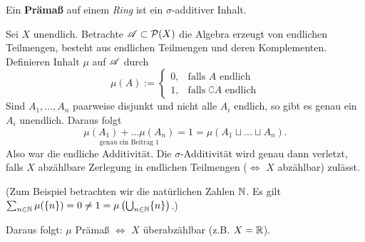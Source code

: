 \begin{definition}
\begin{mdframed}
Ein \textbf{Prämaß} auf einem \emph{Ring} ist ein $\sigma$-additiver Inhalt.
\end{mdframed}
\end{definition}

\begin{example}
Sei $X$ unendlich. Betrachte $\AA \subset \mathcal{P}(X)$ die Algebra erzeugt von endlichen Teilmengen, besteht aus endlichen Teilmengen und deren Komplementen. Definieren Inhalt $\mu$ auf $\AA$ durch
$$ \mu (A) := \begin{cases}
	0, & \text{falls } A \text{ endlich} \\
	1, & \text{falls } \complement A \text{ endlich}
	\end{cases}$$
Sind $A_1,...,A_n$ paarweise disjunkt und nicht alle $A_i$ endlich, so gibt es genau ein $A_i$ unendlich. Daraus folgt
$$\underset{\text{genau ein Beitrag }1}{\mu(A_1)+...\mu(A_n)} = 1 = \mu(A_1 \sqcup ... \sqcup A_n).$$
Also war die endliche Additivität. Die $\sigma$-Additivität wird genau dann verletzt, falls $X$ abzählbare Zerlegung in endlichen Teilmengen ($\iff$ $X$ abzählbar) zulässt. \begin{small}(Zum Beispiel betrachten wir die natürlichen Zahlen $\N$. Es gilt $\sum_{n\in \N} \mu (\{n\}) =0 \neq 1 = \mu \left( \bigcup_{n \in \N} \{n\} \right)$.)
\end{small} Daraus folgt: $\mu $ Prämaß $\iff$ $X$ überabzählbar (z.B. $X = \R$).
\end{example}


